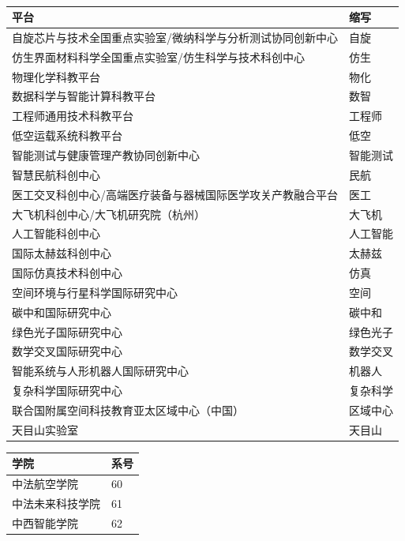 \documentclass[UTF8,fontset=none,zihao=-4]{ctexart}
\begin{document}
\begin{center}

%
\\[2.5mm]

\begin{tabular}{|C{155mm}|C{25mm}|}
\hline
\textbf{平台} & \textbf{缩写} \\
\hline
自旋芯片与技术全国重点实验室/微纳科学与分析测试协同创新中心 & 自旋 \\
\hline
仿生界面材料科学全国重点实验室/仿生科学与技术科创中心 & 仿生 \\
\hline
物理化学科教平台 & 物化 \\
\hline
数据科学与智能计算科教平台 & 数智 \\
\hline
工程师通用技术科教平台 & 工程师 \\
\hline
低空运载系统科教平台 & 低空 \\
\hline
智能测试与健康管理产教协同创新中心 & 智能测试 \\
\hline
智慧民航科创中心 & 民航 \\
\hline
医工交叉科创中心/高端医疗装备与器械国际医学攻关产教融合平台 & 医工 \\
\hline
大飞机科创中心/大飞机研究院（杭州） & 大飞机 \\
\hline
人工智能科创中心 & 人工智能 \\
\hline
国际太赫兹科创中心 & 太赫兹 \\
\hline
国际仿真技术科创中心 & 仿真 \\
\hline
空间环境与行星科学国际研究中心 & 空间 \\
\hline
碳中和国际研究中心 & 碳中和 \\
\hline
绿色光子国际研究中心 & 绿色光子 \\
\hline
数学交叉国际研究中心 & 数学交叉 \\
\hline
智能系统与人形机器人国际研究中心 & 机器人 \\
\hline
复杂科学国际研究中心 & 复杂科学 \\
\hline
联合国附属空间科技教育亚太区域中心（中国） & 区域中心 \\
\hline
天目山实验室 & 天目山 \\
\hline
\end{tabular}

\vspace{8mm}

\begin{tabular}{|C{155mm}|C{25mm}|}
\hline
\textbf{学院} & \textbf{系号} \\
\hline
中法航空学院 & 60 \\
\hline
中法未来科技学院 & 61 \\
\hline
中西智能学院 & 62 \\
\hline
\end{tabular}

\end{center}
\end{document}
